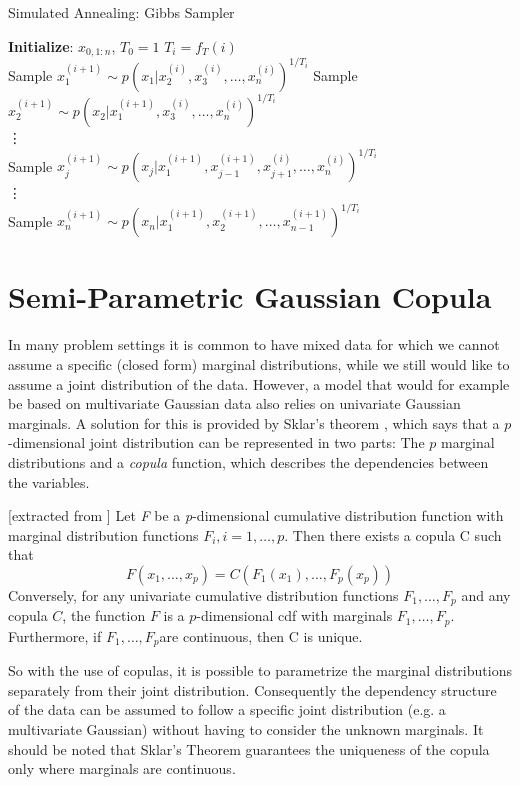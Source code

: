 \begin{algorithm}[H]
	\caption{Simulated Annealing: Gibbs Sampler}\label{alg:SA_Gibbs}
	\begin{algorithmic}
		\State \textbf{Initialize}: $x_{0, 1:n}$, $T_0=1$
		\State $T_{i} = f_T(i)$
		\\
		\State Sample $x_1^{(i+1)}\sim p(x_1|x_2^{(i)}, x_3^{(i)}, \dots, x_n^{(i)})^{1/T_i}  $
		\State Sample $x_2^{(i+1)}\sim p(x_2|x_1^{(i+1)}, x_3^{(i)}, \dots, x_n^{(i)})^{1/T_i}  $
		\\
		\State \vdots
		\\
		\State Sample $x_j^{(i+1)}\sim p(x_j|x_1^{(i+1)}, x_{j-1}^{(i+1)},x_{j+1}^{(i)}, \dots, x_n^{(i)})^{1/T_i}  $
		\\
		\State \vdots
		\\
		\State Sample $x_n^{(i+1)}\sim p(x_n|x_1^{(i+1)}, x_2^{(i+1)}, \dots, x_{n-1}^{(i+1)})^{1/T_i} $
		\EndFor
	\end{algorithmic}
\end{algorithm}

\section{Semi-Parametric Gaussian Copula}
\label{s:semi_copula}
In many problem settings it is common to have mixed data for which we cannot assume a specific (closed form) marginal distributions,
while we still would like to assume a joint distribution of the data.
However, a model that would for example be based on multivariate Gaussian data also relies on univariate Gaussian marginals.
A solution for this is provided by Sklar's theorem \citep{sklar1959fonctions}, which says that a $p$-dimensional joint distribution can be represented in two parts: The $p$ marginal distributions and a \textit{copula} function, which describes the dependencies between the variables.
\begin{tcolorbox}[colback=yellow!5!white,colframe=yellow!75!black, title=Sklar's Theorem]
	\begin{customthm}{}[extracted from \citet{nadarajah2018compendium}]
		\label{th:sklar}
		Let \textit{F} be a \textit{p}-dimensional cumulative distribution function with marginal distribution functions $F_i, i=1,\dots,p$. Then there exists a copula C such that
		$$
		F(x_1,\dots,x_p) = C(F_1(x_1), \dots, F_p(x_p))
		$$
		Conversely, for any univariate cumulative distribution functions 
		$F_1,\dots, F_p$
		and any copula $C$, the function $F$ is a $p$-dimensional \gls{cdf} with marginals $F_1,\dots,F_p$. 
		Furthermore, if $F_1, \dots, F_p$are continuous, then C is unique.
	\end{customthm}
\end{tcolorbox}
So with the use of copulas, it is possible to parametrize the marginal distributions separately from their joint distribution. 
Consequently the dependency structure of the data can be assumed to follow a specific joint distribution (e.g. a multivariate Gaussian) without having to consider the unknown marginals.
It should be noted that Sklar's Theorem guarantees the uniqueness of the copula only where marginals are continuous.

